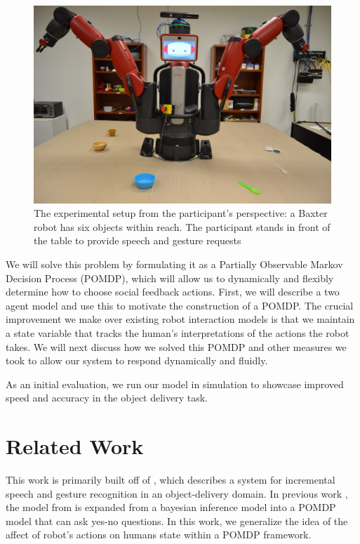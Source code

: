 \documentclass[conference]{IEEEtran}
\begin{document}
\begin{figure}[H]
	\begin{center}
		\includegraphics[scale=0.17]{firstPerson}
		\caption{The experimental setup from the participant's perspective: a Baxter robot has six objects within reach. The participant stands in front of the table to provide speech and gesture requests}
	\end{center}
\end{figure}

We will solve this problem by formulating it as a Partially Observable Markov Decision Process (POMDP)\citep{kaelbling99}, which will allow us to dynamically and flexibly determine how to choose social feedback actions. First, we will describe a two agent model and use this to motivate the construction of a POMDP. The crucial improvement we make over existing robot interaction models is that we maintain a state variable that tracks the human's interpretations of the actions the robot takes. We will next discuss how we solved this POMDP and other measures we took to allow our system to respond dynamically and fluidly. 

As an initial evaluation, we run our model in simulation to showcase improved speed and accuracy in the object delivery task. 


\section{Related Work}

This work is primarily built off of \cite{eldon15thesis}, which describes a system for incremental speech and gesture recognition in an object-delivery domain. In previous work \citep{socialfeedback}, the model from \cite{eldon15thesis} is expanded from a bayesian inference model into a POMDP model that can ask yes-no questions. In this work, we generalize the idea of the affect of robot's actions on humans state within a POMDP framework. 
\end{document}
